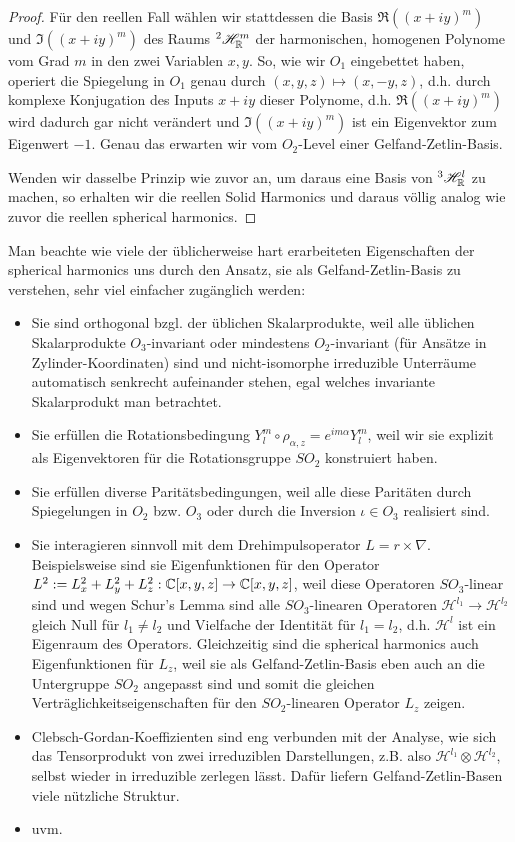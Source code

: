 \begin{proof}
\medbreak
Für den reellen Fall wählen wir stattdessen die Basis $\Re( (x+iy)^m )$ und $\Im( (x+iy)^m )$ des Raums ${^2 \mathscr{H}_{\mathbb{R}}^m}$ der harmonischen, homogenen Polynome vom Grad $m$ in den zwei Variablen $x,y$. So, wie wir $O_1$ eingebettet haben, operiert die Spiegelung in $O_1$ genau durch $(x,y,z)\mapsto(x,-y,z)$, d.h. durch komplexe Konjugation des Inputs $x+iy$ dieser Polynome, d.h. $\Re((x+iy)^m)$ wird dadurch gar nicht verändert und $\Im((x+iy)^m)$ ist ein Eigenvektor zum Eigenwert $-1$. Genau das erwarten wir vom $O_2$-Level einer Gelfand-Zetlin-Basis.

Wenden wir dasselbe Prinzip wie zuvor an, um daraus eine Basis von ${^3\mathscr{H}_{\mathbb{R}}^l}$ zu machen, so erhalten wir die reellen Solid Harmonics und daraus völlig analog wie zuvor die reellen spherical harmonics.
\end{proof}

\begin{remark}
Man beachte wie viele der üblicherweise hart erarbeiteten Eigenschaften der spherical harmonics uns durch den Ansatz, sie als Gelfand-Zetlin-Basis zu verstehen, sehr viel einfacher zugänglich werden:
\begin{itemize}
\item Sie sind orthogonal bzgl. der üblichen Skalarprodukte, weil alle üblichen Skalarprodukte $O_3$-invariant oder mindestens $O_2$-invariant (für Ansätze in Zylinder-Koordinaten) sind und nicht-isomorphe irreduzible Unterräume automatisch senkrecht aufeinander stehen, egal welches invariante Skalarprodukt man betrachtet.
\item Sie erfüllen die Rotationsbedingung $Y_l^m\circ \rho_{\alpha,z} = e^{im\alpha} Y_l^m$, weil wir sie explizit als Eigenvektoren für die Rotationsgruppe $SO_2$ konstruiert haben.
\item Sie erfüllen diverse Paritätsbedingungen, weil alle diese Paritäten durch Spiegelungen in $O_2$ bzw. $O_3$ oder durch die Inversion $\iota\in O_3$ realisiert sind.
\item Sie interagieren sinnvoll mit dem Drehimpulsoperator $L=r\times\nabla$. Beispielsweise sind sie Eigenfunktionen für den Operator $L^2:=L_x^2+L_y^2+L_z^2 : \mathbb{C}[x,y,z]\to\mathbb{C}[x,y,z]$, weil diese Operatoren $SO_3$-linear sind und wegen Schur's Lemma sind alle $SO_3$-linearen Operatoren $\mathscr{H}^{l_1} \to \mathscr{H}^{l_2}$ gleich Null für $l_1\neq l_2$ und Vielfache der Identität für $l_1=l_2$, d.h. $\mathscr{H}^l$ ist ein Eigenraum des Operators. Gleichzeitig sind die spherical harmonics auch Eigenfunktionen für $L_z$, weil sie als Gelfand-Zetlin-Basis eben auch an die Untergruppe $SO_2$ angepasst sind und somit die gleichen Verträglichkeitseigenschaften für den $SO_2$-linearen Operator $L_z$ zeigen.
\item Clebsch-Gordan-Koeffizienten sind eng verbunden mit der Analyse, wie sich das Tensorprodukt von zwei irreduziblen Darstellungen, z.B. also $\mathscr{H}^{l_1}\otimes\mathscr{H}^{l_2}$, selbst wieder in irreduzible zerlegen lässt. Dafür liefern Gelfand-Zetlin-Basen viele nützliche Struktur.
\item uvm.
\end{itemize}
\end{remark}